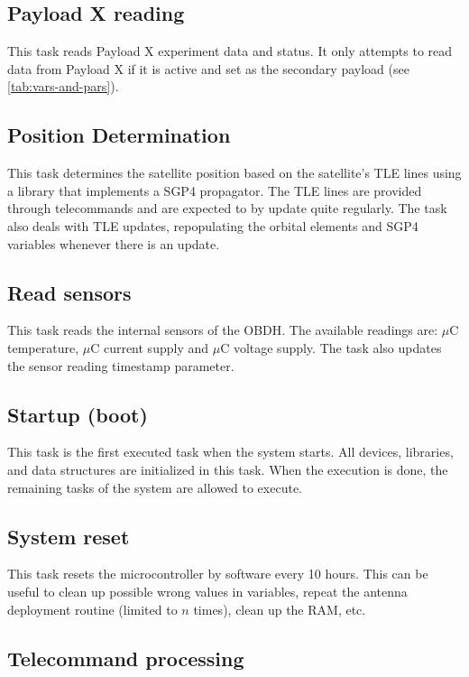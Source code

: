 \subsection{Payload X reading}

This task reads Payload X experiment data and status. It only attempts to read data from Payload X if it is active and set as the secondary payload (see \autoref{tab:vars-and-pars}).

\subsection{Position Determination}

This task determines the satellite position based on the satellite's TLE lines using a library that implements a SGP4 propagator. The TLE lines are provided through telecommands and are expected to by update quite regularly. The task also deals with TLE updates, repopulating the orbital elements and SGP4 variables whenever there is an update.

\subsection{Read sensors}

This task reads the internal sensors of the OBDH. The available readings are: $\mu$C temperature, $\mu$C current supply and $\mu$C voltage supply. The task also updates the sensor reading timestamp parameter.

\subsection{Startup (boot)}

This task is the first executed task when the system starts. All devices, libraries, and data structures are initialized in this task. When the execution is done, the remaining tasks of the system are allowed to execute.

\subsection{System reset}

This task resets the microcontroller by software every 10 hours. This can be useful to clean up possible wrong values in variables, repeat the antenna deployment routine (limited to $n$ times), clean up the RAM, etc.

\subsection{Telecommand processing}

